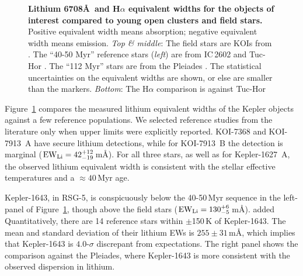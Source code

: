 \documentclass[12pt,twocolumn,tighten,linenumbers]{aastex63}
\begin{document}
\begin{figure}[tp]
\begin{center}
		\vspace{-0.35cm}
	\end{center}
	\vspace{-0.6cm}
	\caption{
    {\bf Lithium 6708\AA\ and H$\alpha$ equivalent widths for the
    objects of interest compared to young open clusters and field
    stars. } Positive equivalent width means absorption; negative
    equivalent width means emission.  
    {\it Top \& middle}:
    The field stars are KOIs from
    \citet{berger_identifying_2018}.  The ``40-50 Myr'' reference
    stars ({\it left}) are from IC\,2602  and
    Tuc-Hor \citep{kraus_stellar_2014}.  The ``112 Myr'' stars
    are from the Pleiades
    \citep{soderblom_evolution_1993,jones_evolution_1996,bouvier_pleiades_lirot_2018}.
    The statistical uncertainties on
    the equivalent widths are shown, or else are
    smaller than the markers.
    {\it Bottom}:
    The H$\alpha$ comparison is against Tuc-Hor
    \citep[$\approx$$40$\,Myr;][]{kraus_stellar_2014}
    \label{fig:lithium}
	}
\end{figure}

Figure~\ref{fig:lithium} compares the measured lithium equivalent
widths of the Kepler objects against a few reference populations.  We
selected reference studies from the literature only when upper limits were
explicitly reported.  KOI-7368 and KOI-7913~A have secure lithium
detections, while for KOI-7913~B the detection is marginal (${\rm EW}_{\rm
Li} = 42^{+12}_{-19}$\,m\AA).  For all three stars, as well as for
Kepler-1627~A, the observed lithium equivalent width is consistent
with the stellar effective temperatures and a $\approx40$\,Myr age.

Kepler-1643, in RSG-5, is conspicuously below the 40-50$\,$Myr
sequence in the left-panel of Figure~\ref{fig:lithium}, though
above the field stars (${\rm EW}_{\rm Li} = 130^{+6}_{-5}$\,m\AA).
added{
Quantitatively, there are 14 reference stars within $\pm$150\,K of Kepler-1643.
The mean and standard deviation of their lithium EWs is $255 \pm 31$\,m\AA,
which implies that Kepler-1643 is $4.0$-$\sigma$ discrepant from expectations.
}
The right panel shows the comparison against the Pleiades, where
Kepler-1643 is more consistent with the observed dispersion in
lithium.
\end{document}
